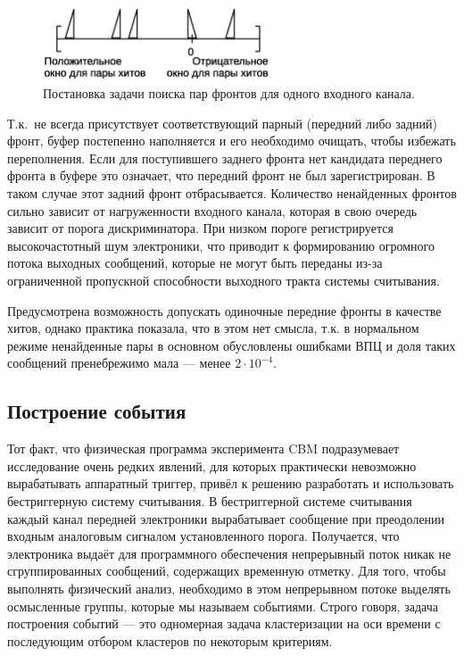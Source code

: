 \begin{figure}[H]
\centering
\includegraphics[width=0.6\textwidth]{pictures/14_Edge_matching_rus.eps}
\caption{Постановка задачи поиска пар фронтов для одного входного канала.}
\label{fig:EdgeMatching}
\end{figure}

Т.к.~не всегда присутствует соответствующий парный (передний либо задний) фронт, буфер постепенно наполняется и его необходимо очищать, чтобы избежать переполнения. Если для поступившего заднего фронта нет кандидата переднего фронта в буфере это означает, что передний фронт не был зарегистрирован. В таком случае этот задний фронт отбрасывается. Количество ненайденных фронтов сильно зависит от нагруженности входного канала, которая в свою очередь зависит от порога дискриминатора. При низком пороге регистрируется высокочастотный шум электроники, что приводит к формированию огромного потока выходных сообщений, которые не могут быть переданы из-за ограниченной пропускной способности выходного тракта системы считывания.

Предусмотрена возможность допускать одиночные передние фронты в качестве хитов, однако практика показала, что в этом нет смысла, т.к. в нормальном режиме ненайденные пары в основном обусловлены ошибками ВПЦ и доля таких сообщений пренебрежимо мала --- менее $ 2 \cdot 10^{-4} $.

\subsection{Построение события}

Тот факт, что физическая программа эксперимента CBM подразумевает исследование очень редких явлений, для которых практически невозможно вырабатывать аппаратный триггер, привёл к решению разработать и использовать бестриггерную систему считывания. В бестриггерной системе считывания каждый канал передней электроники вырабатывает сообщение при преодолении входным аналоговым сигналом установленного порога. Получается, что электроника выдаёт для программного обеспечения непрерывный поток никак не сгруппированных сообщений, содержащих временную отметку. Для того, чтобы выполнять физический анализ, необходимо в этом непрерывном потоке выделять осмысленные группы, которые мы называем событиями. Строго говоря, задача построения событий --- это одномерная задача кластеризации на оси времени с последующим отбором кластеров по некоторым критериям.

